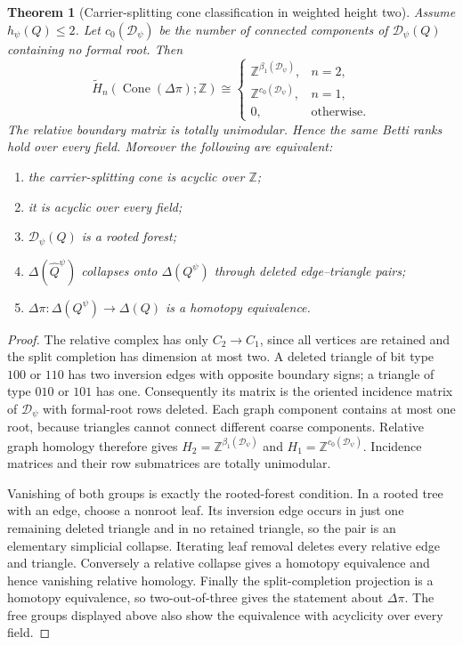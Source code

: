 \documentclass[11pt]{article}
\newtheorem{theorem}{Theorem}[section]
\newcommand{\Cone}{\operatorname{Cone}}
\begin{document}
\begin{theorem}[Carrier-splitting cone classification in weighted height two]
\label{thm:carrier-graph}
Assume $h_\psi(Q)\leq2$.  Let $c_0(\mathcal D_\psi)$ be the number of connected components
of $\mathcal D_\psi(Q)$ containing no formal root.  Then
\[
 \widetilde H_n\!\left(\Cone(\Delta\pi);\mathbb Z\right)
 \cong
 \begin{cases}
   \mathbb Z^{\beta_1(\mathcal D_\psi)},&n=2,\\
   \mathbb Z^{c_0(\mathcal D_\psi)},&n=1,\\
   0,&\text{otherwise}.
 \end{cases}
\]
The relative boundary matrix is totally unimodular.  Hence the same Betti ranks hold
over every field.  Moreover the following are equivalent:
\begin{enumerate}[label=(\roman*)]
\item the carrier-splitting cone is acyclic over $\mathbb Z$;
\item it is acyclic over every field;
\item $\mathcal D_\psi(Q)$ is a rooted forest;
\item $\Delta(\widehat Q^\psi)$ collapses onto $\Delta(Q^\psi)$ through deleted
edge--triangle pairs;
\item $\Delta\pi:\Delta(Q^\psi)\to\Delta(Q)$ is a homotopy equivalence.
\end{enumerate}
\end{theorem}

\begin{proof}
The relative complex has only $C_2\to C_1$, since all vertices are retained
and the split completion has dimension at most two.  A deleted triangle of
bit type $100$ or $110$ has two inversion edges with opposite boundary signs;
a triangle of type $010$ or $101$ has one.  Consequently its matrix is the
oriented incidence matrix of $\mathcal D_\psi$ with formal-root rows deleted.
Each graph component contains at most one root, because triangles cannot
connect different coarse components.  Relative graph homology therefore gives
$H_2=\mathbb Z^{\beta_1(\mathcal D_\psi)}$ and
$H_1=\mathbb Z^{c_0(\mathcal D_\psi)}$.  Incidence matrices and their row
submatrices are totally unimodular.

Vanishing of both groups is exactly the rooted-forest condition.  In a rooted
tree with an edge, choose a nonroot leaf.  Its inversion edge occurs in just
one remaining deleted triangle and in no retained triangle, so the pair is
an elementary simplicial collapse.  Iterating leaf removal deletes every
relative edge and triangle.  Conversely a relative collapse gives a homotopy
equivalence and hence vanishing relative homology.  Finally the split-completion
projection is a homotopy equivalence, so two-out-of-three gives the statement
about $\Delta\pi$.  The free groups displayed above also show the equivalence
with acyclicity over every field.
\end{proof}
\end{document}
